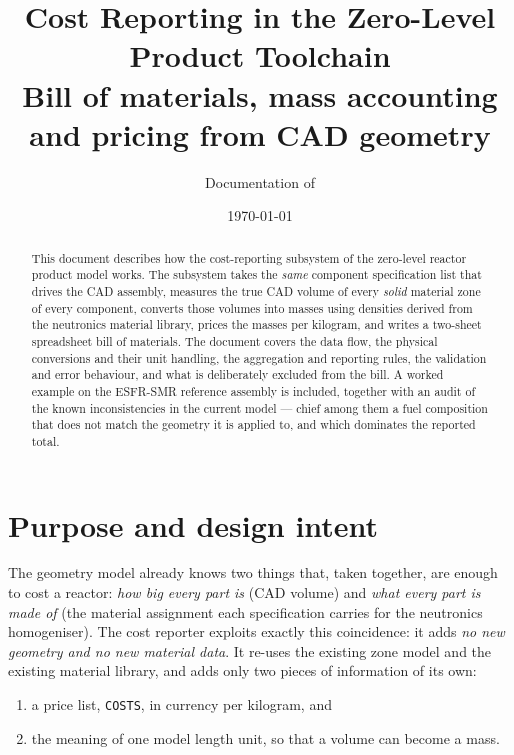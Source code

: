 \documentclass[9pt,a4paper]{extarticle}
\title{\textbf{Cost Reporting in the Zero-Level Product Toolchain}\\[0.4em]
       \large Bill of materials, mass accounting and pricing from CAD geometry}
\author{Documentation of \file{cost\_report.py}}
\date{\today}
\newcommand{\code}[1]{\texttt{\small #1}}
\begin{document}
\maketitle

\begin{abstract}
\noindent
This document describes how the cost-reporting subsystem of the zero-level
reactor product model works. The subsystem takes the \emph{same} component
specification list that drives the CAD assembly, measures the true CAD volume of
every \emph{solid} material zone of every component, converts those volumes into
masses using densities derived from the neutronics material library, prices the
masses per kilogram, and writes a two-sheet spreadsheet bill of materials. The
document covers the data flow, the physical conversions and their unit handling,
the aggregation and reporting rules, the validation and error behaviour, and
what is deliberately excluded from the bill. A worked example on the ESFR-SMR
reference assembly is included, together with an audit of the known
inconsistencies in the current model --- chief among them a fuel composition
that does not match the geometry it is applied to, and which dominates the
reported total.
\end{abstract}

\tableofcontents
\bigskip

\section{Purpose and design intent}

The geometry model already knows two things that, taken together, are enough to
cost a reactor: \emph{how big every part is} (CAD volume) and \emph{what every
part is made of} (the material assignment each specification carries for the
neutronics homogeniser). The cost reporter exploits exactly this coincidence: it
adds \emph{no new geometry and no new material data}. It re-uses the existing
zone model and the existing material library, and adds only two pieces of
information of its own:

\begin{enumerate}
  \item a price list, \code{COSTS}, in currency per kilogram, and
  \item the meaning of one model length unit, so that a volume can become a mass.
\end{enumerate}
\end{document}
